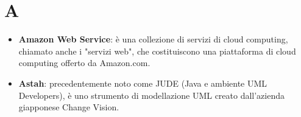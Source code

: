 \section{A}
\begin{itemize}
	\item
	\textbf{Amazon Web Service}: è una collezione di servizi di cloud computing, chiamato anche i "servizi web", che costituiscono una piattaforma di cloud computing offerto da Amazon.com.
	\item 
	\textbf{Astah}: precedentemente noto come JUDE (Java e ambiente UML Developers), è uno strumento di modellazione UML creato dall'azienda giapponese Change Vision.
\end{itemize}